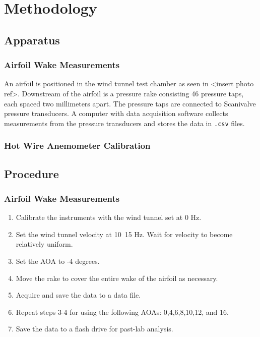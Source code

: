 \chapter{Methodology}
\label{cp:methodology}

\section{Apparatus}\label{sec:apparatus}
\subsection{Airfoil Wake Measurements}
An airfoil is positioned in the wind tunnel test chamber as seen in <insert photo ref>. Downstream of the airfoil is a pressure rake consisting \num{46} pressure taps, each spaced two millimeters apart. The pressure taps are connected to Scanivalve pressure transducers. A computer with data acquisition software collects measurements from the pressure transducers and stores the data in \verb|.csv| files.
\subsection{Hot Wire Anemometer Calibration}

\newpage
\section{Procedure}\label{sec:procedures}
\subsection{Airfoil Wake Measurements}

\begin{enumerate}
\item Calibrate the instruments with the wind tunnel set at 0 Hz.
\item Set the wind tunnel velocity at 10~15 Hz. Wait for velocity to become relatively uniform. 
\item Set the AOA to -4 degrees. 
\item Move the rake to cover the entire wake of the airfoil as necessary.
\item Acquire and save the data to a data file.
\item Repeat steps 3-4 for using the following AOAs: 0,4,6,8,10,12, and 16.
\item Save the data to a flash drive for past-lab analysis.
\end{enumerate}

